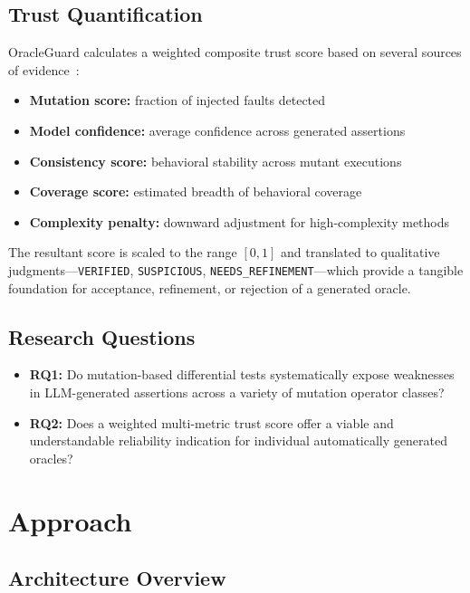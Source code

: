 \documentclass[conference]{IEEEtran}
\begin{document}
\subsection{Trust Quantification}

OracleGuard calculates a weighted composite trust score based on several sources of evidence~\cite{xiong2023express_confidence,liu2024uncertainty_estimation}:

\begin{itemize}
\item \textbf{Mutation score:} fraction of injected faults detected
\item \textbf{Model confidence:} average confidence across generated assertions
\item \textbf{Consistency score:} behavioral stability across mutant executions
\item \textbf{Coverage score:} estimated breadth of behavioral coverage
\item \textbf{Complexity penalty:} downward adjustment for high-complexity methods
\end{itemize}

The resultant score is scaled to the range $[0, 1]$ and translated to qualitative judgments---\texttt{VERIFIED}, \texttt{SUSPICIOUS}, \texttt{NEEDS\_REFINEMENT}---which provide a tangible foundation for acceptance, refinement, or rejection of a generated oracle.

\subsection{Research Questions}

\begin{itemize}
\item \textbf{RQ1:} Do mutation-based differential tests systematically expose weaknesses in LLM-generated assertions across a variety of mutation operator classes?
\item \textbf{RQ2:} Does a weighted multi-metric trust score offer a viable and understandable reliability indication for individual automatically generated oracles?
\end{itemize}

\section{Approach}

\subsection{Architecture Overview}
\end{document}
